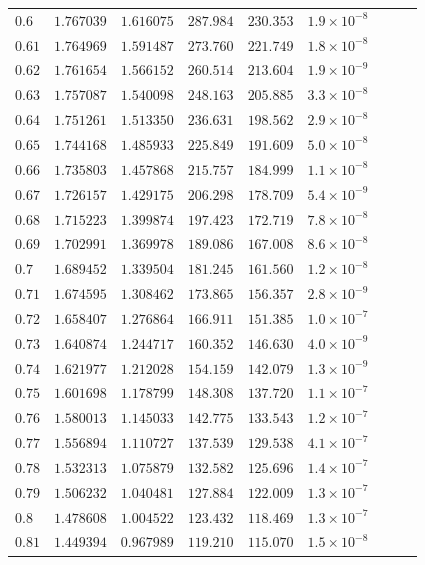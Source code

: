 \documentclass[12pt]{extarticle}
\theoremstyle{plain}
\theoremstyle{remark}
\begin{document}
\begin{longtable}{lcccccccc}
$0.6$ & $1.767039$ & $1.616075$ & $287.984$ & $230.353$ & $1.9\times10^{-8}$ \\
$0.61$ & $1.764969$ & $1.591487$ & $273.760$ & $221.749$ & $1.8\times10^{-8}$ \\
$0.62$ & $1.761654$ & $1.566152$ & $260.514$ & $213.604$ & $1.9\times10^{-9}$ \\
$0.63$ & $1.757087$ & $1.540098$ & $248.163$ & $205.885$ & $3.3\times10^{-8}$ \\
$0.64$ & $1.751261$ & $1.513350$ & $236.631$ & $198.562$ & $2.9\times10^{-8}$ \\
$0.65$ & $1.744168$ & $1.485933$ & $225.849$ & $191.609$ & $5.0\times10^{-8}$ \\
$0.66$ & $1.735803$ & $1.457868$ & $215.757$ & $184.999$ & $1.1\times10^{-8}$ \\
$0.67$ & $1.726157$ & $1.429175$ & $206.298$ & $178.709$ & $5.4\times10^{-9}$ \\
$0.68$ & $1.715223$ & $1.399874$ & $197.423$ & $172.719$ & $7.8\times10^{-8}$ \\
$0.69$ & $1.702991$ & $1.369978$ & $189.086$ & $167.008$ & $8.6\times10^{-8}$ \\
$0.7$ & $1.689452$ & $1.339504$ & $181.245$ & $161.560$ & $1.2\times10^{-8}$ \\
$0.71$ & $1.674595$ & $1.308462$ & $173.865$ & $156.357$ & $2.8\times10^{-9}$ \\
$0.72$ & $1.658407$ & $1.276864$ & $166.911$ & $151.385$ & $1.0\times10^{-7}$ \\
$0.73$ & $1.640874$ & $1.244717$ & $160.352$ & $146.630$ & $4.0\times10^{-9}$ \\
$0.74$ & $1.621977$ & $1.212028$ & $154.159$ & $142.079$ & $1.3\times10^{-9}$ \\
$0.75$ & $1.601698$ & $1.178799$ & $148.308$ & $137.720$ & $1.1\times10^{-7}$ \\
$0.76$ & $1.580013$ & $1.145033$ & $142.775$ & $133.543$ & $1.2\times10^{-7}$ \\
$0.77$ & $1.556894$ & $1.110727$ & $137.539$ & $129.538$ & $4.1\times10^{-7}$ \\
$0.78$ & $1.532313$ & $1.075879$ & $132.582$ & $125.696$ & $1.4\times10^{-7}$ \\
$0.79$ & $1.506232$ & $1.040481$ & $127.884$ & $122.009$ & $1.3\times10^{-7}$ \\
$0.8$ & $1.478608$ & $1.004522$ & $123.432$ & $118.469$ & $1.3\times10^{-7}$ \\
$0.81$ & $1.449394$ & $0.967989$ & $119.210$ & $115.070$ & $1.5\times10^{-8}$ \\

\end{longtable}
\end{document}
